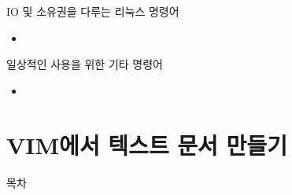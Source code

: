 \documentclass[aspectratio=1610,20pt,xcolor=pdftex,dvipsnames,table,handout]{beamer}
\begin{document}
		\begin{frame} [t,plain]

			\begin{block} {IO 및 소유권을 다루는 리눅스 명령어}
			\setlength{\leftmargini}{2em}			
			\begin{itemize}
				\item 
			\end{itemize}
			\end{block}						

		\end{frame}			

		\begin{frame} [t,plain]

			\begin{block} {일상적인 사용을 위한 기타 명령어}
			\setlength{\leftmargini}{2em}			
			\begin{itemize}
				\item 
			\end{itemize}
			\end{block}						

		\end{frame}			


		\begin{frame} [t,plain]
		\end{frame}			


		\begin{frame} [t,plain]
		\end{frame}			


		\part{VIM에서 텍스트 문서 만들기}
		\frame{\partpage}

\label{part1} 	%


		\begin{frame} [plain]{목차}
		\tableofcontents%
		\end{frame}
		
\end{document}
